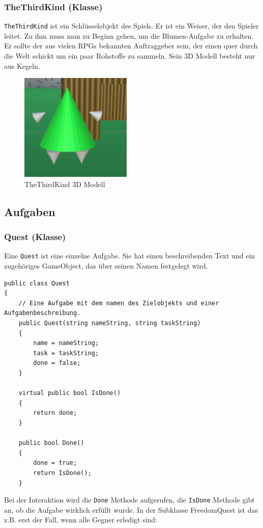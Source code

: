 \subsubsection{TheThirdKind (Klasse)}
\lstinline{TheThirdKind} ist ein Schlüsselobjekt des Spiels. Er ist ein Weiser, der den Spieler leitet. Zu ihm muss man zu Beginn gehen, um die Blumen-Aufgabe zu erhalten.
Er sollte der aus vielen RPGs bekannten Auftraggeber sein, der einen quer durch die Welt schickt um ein paar Rohstoffe zu sammeln. Sein 3D Modell besteht nur aus Kegeln.
\begin{figure}[H]
\includegraphics[scale=1]{screenshots/t3k.png}
\caption{ TheThirdKind 3D Modell}
\end{figure}


\subsection{Aufgaben}

\subsubsection{Quest (Klasse)}
Eine \lstinline{Quest} ist eine einzelne Aufgabe. Sie hat einen beschreibenden Text und ein zugehöriges GameObject, das über seinen Namen festgelegt wird.

\begin{lstlisting}[caption={Quest Constructor}]
public class Quest
{
	// Eine Aufgabe mit dem namen des Zielobjekts und einer Aufgabenbeschreibung.
	public Quest(string nameString, string taskString)
	{
		name = nameString;
		task = taskString;
		done = false;
	}

	virtual public bool IsDone()
	{
		return done;
	}

	public bool Done()
	{
		done = true;
		return IsDone();
	}

\end{lstlisting}

Bei der Interaktion wird die \lstinline{Done} Methode aufgerufen, die \lstinline{IsDone} Methode gibt an, ob die Aufgabe wirklich erfüllt wurde. In der Subklasse FreedomQuest ist das z.B. erst der Fall, wenn alle Gegner erledigt sind:

